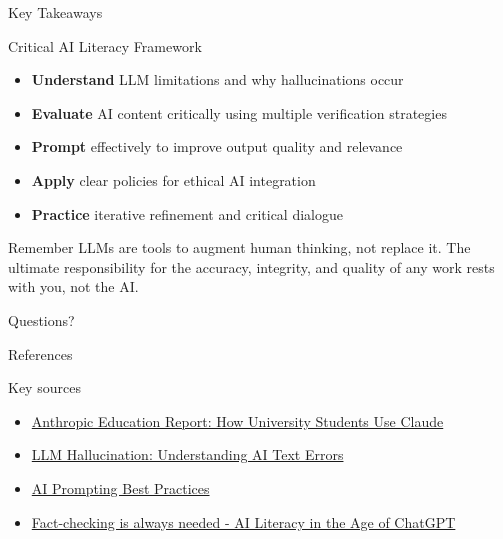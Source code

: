 \documentclass{beamer}
\begin{document}
\begin{frame}{Key Takeaways}
\begin{block}{Critical AI Literacy Framework}
\begin{itemize}
  \item \textbf{Understand} LLM limitations and why hallucinations occur
  \item \textbf{Evaluate} AI content critically using multiple verification strategies
  \item \textbf{Prompt} effectively to improve output quality and relevance
  \item \textbf{Apply} clear policies for ethical AI integration
  \item \textbf{Practice} iterative refinement and critical dialogue
\end{itemize}
\end{block}

\begin{alertblock}{Remember}
LLMs are tools to augment human thinking, not replace it. The ultimate responsibility for the accuracy, integrity, and quality of any work rests with you, not the AI.
\end{alertblock}
\end{frame}


\begin{frame}
\centering
\Huge{Questions?}
\end{frame}
\begin{frame}{References}
\begin{block}{Key sources}
\begin{itemize}
  \item \href{https://www.anthropic.com/news/anthropic-education-report-how-university-students-use-claude}{Anthropic Education Report: How University Students Use Claude}
  \item \href{https://labelyourdata.com/articles/llm-fine-tuning/llm-hallucination}{LLM Hallucination: Understanding AI Text Errors}
  \item \href{https://www.codecademy.com/article/ai-prompting-best-practices}{AI Prompting Best Practices}
  \item \href{https://libguides.library.arizona.edu/ai-literacy-instructors/verify-facts}{Fact-checking is always needed - AI Literacy in the Age of ChatGPT}
\end{itemize}
\end{block}
\end{frame}
\end{document}
